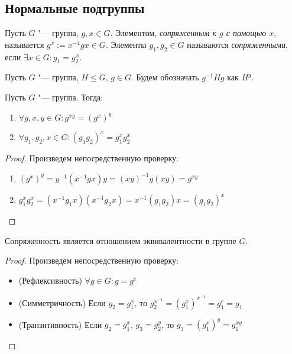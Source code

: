 \subsection{Нормальные подгруппы}

\begin{definition}
	Пусть $G$ "--- группа, $g, x \in G$. Элементом, \textit{сопряженным к $g$ с помощью $x$}, называется $g^x := x^{-1}gx \in G$. Элементы $g_1, g_2 \in G$ называются \textit{сопряженными}, если $\exists x \in G: g_1 = g_2^x$.
\end{definition}

\begin{note}
	Пусть $G$ "--- группа, $H \le G$, $g \in G$. Будем обозначать $g^{-1}Hg$ как $H^g$.
\end{note}

\begin{proposition} Пусть $G$ "--- группа. Тогда:
	\begin{enumerate}
		\item $\forall g, x, y \in G: g^{xy} = (g^x)^y$
		
		\item $\forall g_1, g_2, x \in G: (g_1g_2)^x = g_1^xg_2^x$
	\end{enumerate}
\end{proposition}

\begin{proof} Произведем непосредственную проверку:
	\begin{enumerate}
		\item $(g^x)^y = y^{-1}(x^{-1}gx)y = (xy)^{-1}g(xy) = g^{xy}$
		
		\item $g_1^xg_2^x = (x^{-1}g_1x)(x^{-1}g_2x) = x^{-1}(g_1g_2)x = (g_1g_2)^x$
	\end{enumerate}
\end{proof}

\begin{proposition}
	Сопряженность является отношением эквивалентности в группе $G$.
\end{proposition}

\begin{proof} Произведем непосредственную проверку:
	\begin{itemize}
		\item (Рефлексивность) $\forall g \in G: g = g^e$
		
		\item (Симметричность) Если $g_2 = g_1^x$, то $g_2^{x^{-1}} = (g_1^x)^{x^{-1}} = g_1^e = g_1$
		
		\item (Транзитивность) Если $g_2 = g_1^x$, $g_3 = g_2^y$, то $g_3 = (g_1^x)^y = g_1^{xy}$
	\end{itemize}
\end{proof}


